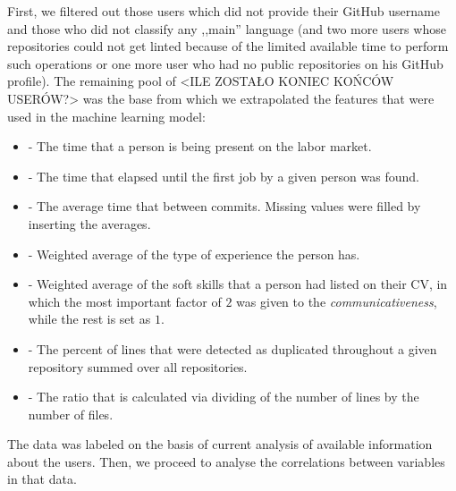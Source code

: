First, we filtered out those users which did not provide their GitHub username and those who did not classify any ,,main'' language (and two more users whose repositories could not get linted because of the limited available time to perform such operations or one more user who had no public repositories on his GitHub profile). The remaining pool of <ILE ZOSTAŁO KONIEC KOŃCÓW USERÓW?> was the base from which we extrapolated the features that were used in the machine learning model:

\begin{itemize}
  \item {} - The time that a person is being present on the labor market.
  \item {} - The time that elapsed until the first job by a given person was found.
  \item {} - The average time that between commits. Missing values were filled by inserting the averages.
  \item {} - Weighted average of the type of experience the person has.
  \item {} - Weighted average of the soft skills that a person had listed on their CV, in which the most important factor of $2$ was given to the \emph{communicativeness}, while the rest is set as $1$. 
  \item {} - The percent of lines that were detected as duplicated throughout a given repository summed over all repositories.
  \item {} - The ratio that is calculated via dividing of the number of lines by the number of files.
\end{itemize}

The data was labeled on the basis of current analysis of available information about the users. Then, we proceed to analyse the correlations between variables in that data.